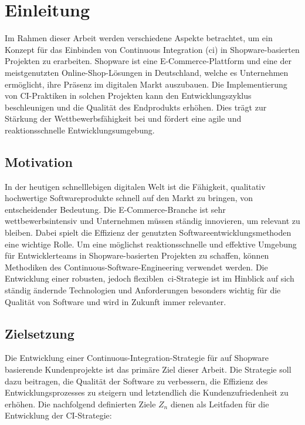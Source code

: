 
\section{Einleitung} \label{sec:01-introduction}

Im Rahmen dieser Arbeit werden verschiedene Aspekte betrachtet, um ein Konzept für das Einbinden von
Continuous Integration (\acrshort{ci}) in Shopware-basierten Projekten zu erarbeiten.
Shopware ist eine E-Commerce-Plattform und eine der meistgenutzten Online-Shop-Lösungen in
Deutschland, welche es Unternehmen ermöglicht, ihre Präsenz im digitalen Markt
auszubauen.
Die Implementierung von CI-Praktiken in solchen Projekten kann den Entwicklungszyklus beschleunigen und die
Qualität des Endprodukts erhöhen.
Dies trägt zur Stärkung der Wettbewerbsfähigkeit bei und fördert eine agile und reaktionsschnelle Entwicklungsumgebung.

\subsection{Motivation} \label{subsec:01-introduction-1}

In der heutigen schnelllebigen digitalen Welt ist die Fähigkeit, qualitativ hochwertige Softwareprodukte schnell auf den
Markt zu bringen, von entscheidender Bedeutung.
Die E-Commerce-Branche ist sehr wettbewerbsintensiv und Unternehmen müssen ständig innovieren, um relevant zu
bleiben.
Dabei spielt die Effizienz der genutzten Softwareentwicklungsmethoden eine wichtige Rolle.
Um eine möglichst reaktionsschnelle und effektive Umgebung für Entwicklerteams in Shopware-basierten Projekten zu
schaffen, können Methodiken des Continuous-Software-Engineering verwendet werden.
Die Entwicklung einer robusten, jedoch flexiblen\ \acrshort{ci}-Strategie ist im Hinblick auf sich ständig ändernde
Technologien und Anforderungen besonders wichtig für die Qualität von Software und wird in Zukunft immer relevanter.

\subsection{Zielsetzung} \label{subsec:01-introduction-2}

Die Entwicklung einer Continuous-Integration-Strategie für auf Shopware basierende Kundenprojekte ist das primäre Ziel
dieser Arbeit.
Die Strategie soll dazu beitragen, die Qualität der Software zu verbessern, die Effizienz des Entwicklungsprozesses zu
steigern und letztendlich die Kundenzufriedenheit zu erhöhen.
Die nachfolgend definierten Ziele $Z_n$ dienen als Leitfaden für die Entwicklung der CI-Strategie:

